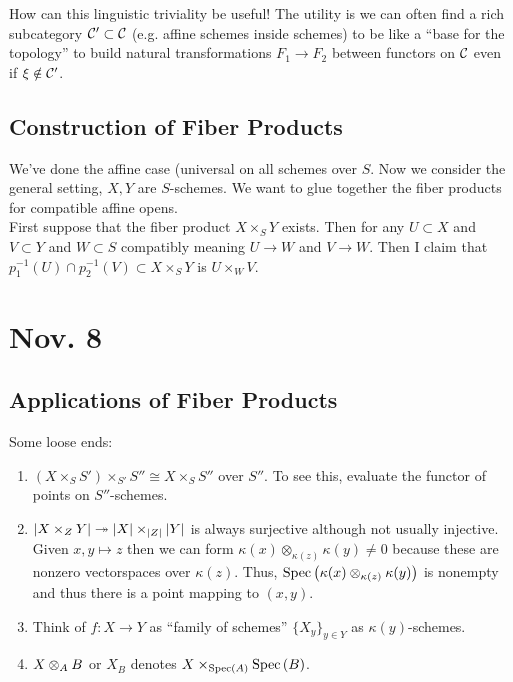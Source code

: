 \documentclass[12pt]{article}
\begin{document}
\begin{rmk}
How can this linguistic triviality be useful! The utility is we can often find a rich subcategory $\mathcal{C}' \subset \mathcal{C}$ (e.g. affine schemes inside schemes) to be like a ``base for the topology'' to build natural transformations $F_1 \to F_2$ between functors on $\mathcal{C}$ even if $\xi \notin \mathcal{C}'$. 
\end{rmk}

\subsection{Construction of Fiber Products}

We've done the affine case (universal on all schemes over $S$. Now we consider the general setting, $X, Y$ are $S$-schemes. We want to glue together the fiber products for compatible affine opens. 
\bigskip\\
First suppose that the fiber product $X \times_S Y$ exists. Then for any $U \subset X$ and $V \subset Y$ and $W \subset S$ compatibly meaning $U \to W$ and $V \to W$. Then I claim that $p_1^{-1}(U) \cap p_2^{-1}(V) \subset X \times_S Y$ is $U \times_W V$.  

\section{Nov. 8}

\subsection{Applications of Fiber Products}

Some loose ends:
\begin{enumerate}
\item $(X \times_S S') \times_{S'} S'' \cong X \times_S S''$ over $S''$. To see this, evaluate the functor of points on $S''$-schemes.
\item $|X \times_Z Y| \twoheadrightarrow |X| \times_{|Z|} |Y|$ is always surjective although not usually injective. Given $x, y \mapsto z$ then we can form $\kappa(x) \otimes_{\kappa(z)} \kappa(y) \neq 0$ because these are nonzero vectorspaces over $\kappa(z)$. Thus, $\mathrm{Spec}\left( \kappa(x) \otimes_{\kappa(z)} \kappa(y) \right)$ is nonempty and thus there is a point mapping to $(x,y)$.
\item Think of $f : X \to Y$ as ``family of schemes'' $\{ X_y \}_{y \in Y}$ as $\kappa(y)$-schemes.
\item $X \otimes_A B$ or $X_B$ denotes $X \times_{\mathrm{Spec}\left( A \right)} \mathrm{Spec}\left( B \right)$.
\end{enumerate}
\end{document}
